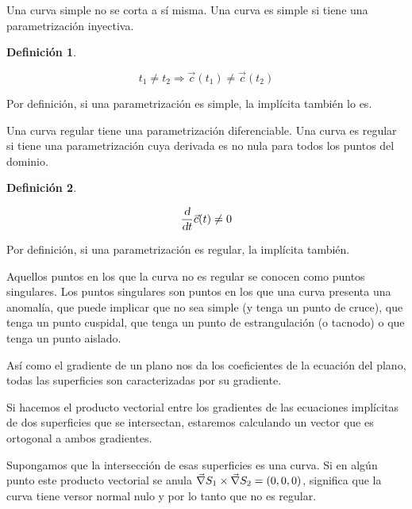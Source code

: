 \documentclass[a5paper,12pt,twoside]{book}
\newtheorem{defn}{{Definición}}[chapter]
\begin{document}
Una curva simple no se corta a sí misma. Una curva es simple si tiene una parametrización inyectiva.

\begin{mdframed}[style=MyFrame1]
    \begin{defn}
    \end{defn}
    \begin{equation*}
        t_1 \neq t_2 \Rightarrow \Vec{c}(t_1) \neq \Vec{c}(t_2)
    \end{equation*}
\end{mdframed}

Por definición, si una parametrización es simple, la implícita también lo es.

Una curva regular tiene una parametrización diferenciable. Una curva es regular si tiene una parametrización cuya derivada es no nula para todos los puntos del dominio.

\begin{mdframed}[style=MyFrame1]
    \begin{defn}
    \end{defn}
    \begin{equation*}
        \frac{\textsl{d}}{\textsl{d} t} \Vec{c}(t) \neq 0
    \end{equation*}
\end{mdframed}

Por definición, si una parametrización es regular, la implícita también. 

Aquellos puntos en los que la curva no es regular se conocen como puntos singulares. Los puntos singulares son puntos en los que una curva presenta una anomalía, que puede implicar que no sea simple (y tenga un punto de cruce), que tenga un punto cuspidal, que tenga un punto de estrangulación (o tacnodo) o que tenga un punto aislado.

Así como el gradiente de un plano nos da los coeficientes de la ecuación del plano, todas las superficies son caracterizadas por su gradiente.

Si hacemos el producto vectorial entre los gradientes de las ecuaciones implícitas de dos superficies que se intersectan, estaremos calculando un vector que es ortogonal a ambos gradientes.

Supongamos que la intersección de esas superficies es una curva. Si en algún punto este producto vectorial se anula $\Vec{\nabla} S_1 \times \Vec{\nabla} S_2 = (0,0,0)$, significa que la curva tiene versor normal nulo y por lo tanto que no es regular.
\end{document}
